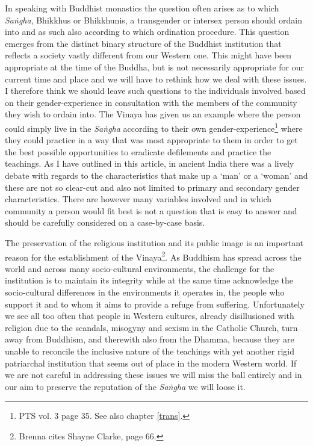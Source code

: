 In speaking with Buddhist monastics the question often arises as to which {\em Saṅgha}, Bhikkhus or Bhikkhunis, a transgender or intersex person should ordain into and as such also according to which ordination procedure. This question emerges from the distinct binary structure of the Buddhist institution that reflects a society vastly different from our Western one. This might have been appropriate at the time of the Buddha, but is not necessarily appropriate for our current time and place and we will have to rethink how we deal with these issues. I therefore think we should leave such questions to the individuals involved based on their gender-experience in consultation with the members of the community they wish to ordain into. The Vinaya has given us an example where the person could simply live in the {\em Saṅgha} according to their own gender-experience\footnote{PTS vol. 3 page 35. See also chapter \ref{trans}.} where they could practice in a way that was most appropriate to them in order to get the best possible opportunities to eradicate defilements and practice the teachings. As I have outlined in this article, in ancient India there was a lively debate with regards to the characteristics that make up a `man' or a `woman' and these are not so clear-cut and also not limited to primary and secondary gender characteristics. There are however many variables involved and in which community a person would fit best is not a question that is easy to answer and should be carefully considered on a case-by-case basis. 

The preservation of the religious institution and its public image is an important reason for the establishment of the Vinaya\footnote{Brenna \cite{artinger} cites Shayne Clarke, page 66.}. As Buddhism has spread across the world and across many socio-cultural environments, the challenge for the institution is to maintain its integrity while at the same time acknowledge the socio-cultural differences in the environments it operates in, the people who support it and to whom it aims to provide a refuge from suffering. Unfortunately we see all too often that people in Western cultures, already disillusioned with religion due to the scandals, misogyny and sexism in the Catholic Church, turn away from Buddhism, and therewith also from the Dhamma, because they are unable to reconcile the inclusive nature of the teachings with yet another rigid patriarchal institution that seems out of place in the modern Western world. If we are not careful in addressing these issues we will miss the ball entirely and in our aim to preserve the reputation of the {\em Saṅgha} we will loose it.


